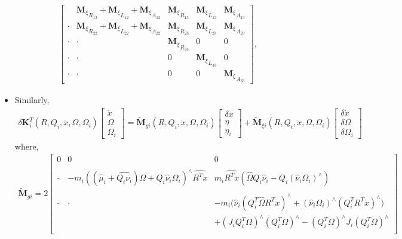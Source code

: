 \documentclass[10pt]{article}
\begin{document}
\begin{itemize}
\begin{align}
\begin{bmatrix}
& {\mathbf{M}_\xi}_{R_{12 }} + {\mathbf{M}_\xi}_{L_{12}} + {\mathbf{M}_\xi}_{A_{12}}
& {\mathbf{M}_\xi}_{R_{13 }}
& {\mathbf{M}_\xi}_{L_{13}} 
& {\mathbf{M}_\xi}_{A_{13}} \\
\cdot & {\mathbf{M}_\xi}_{R_{22}} + {\mathbf{M}_\xi}_{L_{22}} + {\mathbf{M}_\xi}_{A_{22}}
& {\mathbf{M}_\xi}_{R_{23}} 
& {\mathbf{M}_\xi}_{L_{23}} 
& {\mathbf{M}_\xi}_{A_{23}} \\
\cdot & \cdot &  {\mathbf{M}_\xi}_{R_{33}}
& 0 & 0 \\
\cdot & \cdot & 0
& {\mathbf{M}_\xi}_{L_{33}} & 0 \\
\cdot & \cdot & 0 & 0 & {\mathbf{M}_\xi}_{A_{33}}
\end{bmatrix},
\end{align}

\item Similarly,
\begin{align*}
\delta \mathbf{K}_i^T(R,Q_i,\dot{x},\Omega,\Omega_i) \begin{bmatrix}
\dot{x} \\ \Omega \\ \Omega_i
\end{bmatrix}  = \tilde{\mathbf{M}}_{gi}(R,Q_i,\dot{x},\Omega,\Omega_i) \begin{bmatrix}
\delta x \\ \eta \\ \eta_i
\end{bmatrix} + \tilde{\mathbf{M}}_{\xi i}(R,Q_i,\dot{x},\Omega,\Omega_i) \begin{bmatrix}
\delta \dot{x} \\ \delta \Omega \\ \delta \Omega_i
\end{bmatrix}
\end{align*}
where,
\begin{align*}
\tilde{\mathbf{M}}_{gi} = 2 \begin{bmatrix}
0 & 0 & 0 \\\\
\cdot & -m_i ((\hat\mu_i+\widehat{Q_i\nu_i})\Omega + Q_i\hat\nu_i\Omega_i)^\wedge \widehat{R^T\dot{x}} & m_i \widehat{R^T\dot{x}} (\hat{\Omega} Q_i \hat{\nu}_i - Q_i(\hat{\nu}_i\Omega_i)^\wedge) \\\\
\cdot & \cdot & -m_i \bigl( \hat\nu_i (Q_i^T \hat{\Omega} R^T \dot{x})^\wedge + (\hat{\nu}_i\Omega_i)^\wedge (Q_i^T R^T \dot{x})^\wedge \bigr) \\
& & + (J_i Q_i^T \Omega)^\wedge (Q_i^T \Omega)^\wedge -(Q_i^T \Omega)^\wedge J_i (Q_i^T \Omega)^\wedge \\

\end{bmatrix}
\end{align*}
\end{itemize}
\end{document}
